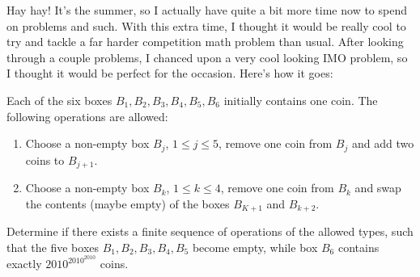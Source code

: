 \newcommand{\boxdiagram}[7][]{
    \begin{center}
    \begin{tikzpicture}
        \draw[thick] (0, 0) rectangle (1, 1);
        \draw[thick] (2, 0) rectangle (3, 1);
        \draw[thick] (4, 0) rectangle (5, 1);
        \draw[thick] (6, 0) rectangle (7, 1);
        \draw[thick] (8, 0) rectangle (9, 1);
        \draw[thick] (10, 0) rectangle (11, 1);

        \node at (0.5, 0.5) {#2};
        \node at (2.5, 0.5) {#3};
        \node at (4.5, 0.5) {#4};
        \node at (6.5, 0.5) {#5};
        \node at (8.5, 0.5) {#6};
        \node at (10.5, 0.5) {#7};

        \ifthenelse{\equal{#1}{}}{}{
            \draw[thick, ->] (5.5, -0.25) -- (5.5, -1.25);
            \node at (6, -0.75) {\ensuremath{#1}};
        }
    \end{tikzpicture}
    \end{center}
}

Hay hay! It's the summer, so I actually have quite a bit more time now to spend
on problems and such.  With this extra time, I thought
it would be really cool to try and tackle a far harder competition math problem
than usual. After looking through a couple problems, I chanced upon a very cool
looking IMO problem, so I thought it would be perfect for the occasion. Here's
how it goes:

\begin{blackbox}
    \begin{problem}
        Each of the six boxes \( B_1, B_2, B_3, B_4, B_5, B_6 \) initially
        contains one coin. The following operations are allowed:

        \begin{enumerate}[topsep=10pt, itemsep=5pt]
            \item Choose a non-empty box \( B_j \), \( 1 \le j \le 5 \), remove
                one coin from \( B_j \) and add two coins to \( B_{j + 1} \).
            \item Choose a non-empty box \( B_k \), \( 1 \le k \le 4 \), remove
                one coin from \( B_k \) and swap the contents (maybe empty) of
                the boxes \( B_{K+1} \) and \( B_{k+2} \).
        \end{enumerate}

        Determine if there exists a finite sequence of operations of the
        allowed types, such that the five boxes \( B_1, B_2, B_3, B_4, B_5 \)
        become empty, while box \( B_6 \) contains exactly \(
        2010^{2010^{2010}} \) coins.
    \end{problem}
\end{blackbox}

